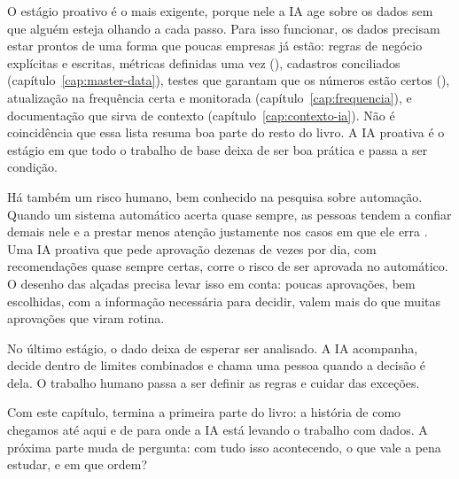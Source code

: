 O estágio proativo é o mais exigente, porque nele a IA age sobre os dados sem que alguém
esteja olhando a cada passo. Para isso funcionar, os dados precisam estar prontos de uma forma
que poucas empresas já estão: regras de negócio explícitas e escritas, métricas definidas uma
vez (), cadastros conciliados (capítulo~\ref{cap:master-data}),
testes que garantam que os números estão certos (), atualização na frequência
certa e monitorada (capítulo~\ref{cap:frequencia}), e documentação que sirva de contexto
(capítulo~\ref{cap:contexto-ia}). Não é coincidência que essa lista resuma boa parte do resto
do livro. A IA proativa é o estágio em que todo o trabalho de base deixa de ser boa prática e
passa a ser condição.

Há também um risco humano, bem conhecido na pesquisa sobre automação. Quando um sistema
automático acerta quase sempre, as pessoas tendem a confiar demais nele e a prestar menos
atenção justamente nos casos em que ele erra \parencite{parasuraman2010}. Uma IA proativa que
pede aprovação dezenas de vezes por dia, com recomendações quase sempre certas, corre o risco
de ser aprovada no automático. O desenho das alçadas precisa levar isso em conta: poucas
aprovações, bem escolhidas, com a informação necessária para decidir, valem mais do que muitas
aprovações que viram rotina.

\begin{destaque}
No último estágio, o dado deixa de esperar ser analisado. A IA acompanha, decide dentro de
limites combinados e chama uma pessoa quando a decisão é dela. O trabalho humano passa a ser
definir as regras e cuidar das exceções.
\end{destaque}

Com este capítulo, termina a primeira parte do livro: a história de como chegamos até aqui e
de para onde a IA está levando o trabalho com dados. A próxima parte muda de pergunta: com
tudo isso acontecendo, o que vale a pena estudar, e em que ordem?

\begin{leituras}
\end{leituras}
